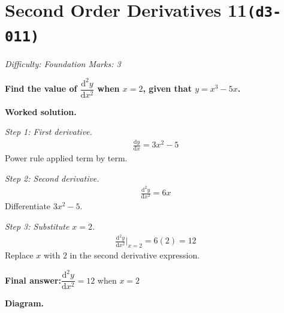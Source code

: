 \documentclass[11pt]{article}
\newcommand{\question}[1]{\par\medskip\noindent\textbf{#1}\par}
\begin{document}
\section*{Second Order Derivatives 11\quad\small\texttt{(d3-011)}}
\textit{Difficulty: Foundation \quad\textbar\quad Marks: 3}

\question{Find the value of \( \dfrac{\mathrm{d}^2y}{\mathrm{d}x^2} \) when \( x = 2 \), given that \( y = x^3 - 5x \).}

\textbf{Worked solution.}

\textit{Step 1: First derivative.}
\[\begin{gathered}
\frac{\mathrm{d}y}{\mathrm{d}x} = 3x^2 - 5
\end{gathered}\]
Power rule applied term by term.

\textit{Step 2: Second derivative.}
\[\begin{gathered}
\frac{\mathrm{d}^2y}{\mathrm{d}x^2} = 6x
\end{gathered}\]
Differentiate \(3x^2 - 5\).

\textit{Step 3: Substitute \( x = 2 \).}
\[\begin{gathered}
\frac{\mathrm{d}^2y}{\mathrm{d}x^2}\bigg|_{x=2} = 6(2) = 12
\end{gathered}\]
Replace \(x\) with \(2\) in the second derivative expression.

\begin{answerbox}
\textbf{Final answer:}\quad \(\displaystyle  \dfrac{\mathrm{d}^2y}{\mathrm{d}x^2} = 12 \) when \(\displaystyle  x = 2 \)
\end{answerbox}
\textbf{Diagram.}
\end{document}
